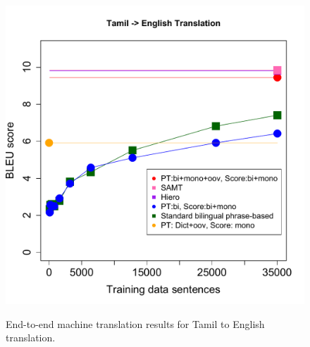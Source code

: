 \documentclass[11pt]{article}
\begin{document}
\begin{figure}
\vskip 0.0in
\begin{center}
\includegraphics[width=1.05 \linewidth]{Figures/tatranslate.pdf}
\vskip -0.15in
\caption{End-to-end machine translation results for Tamil to English translation.}
\vskip -0.2in
\label{fig:tatrans} 
\end{center}
\end{figure}

\newpage



\end{document}
